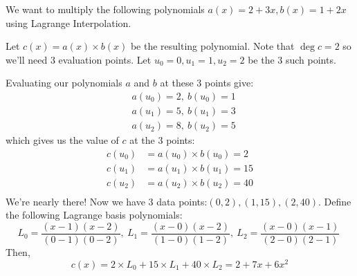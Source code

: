 \begin{example}{}{}
    We want to multiply the following polynomials $a(x) = 2 + 3x, b(x) = 1 + 2x$ using Lagrange Interpolation.

    Let $c(x) = a(x) \times b(x)$ be the resulting polynomial.
    Note that $\deg c = 2$ so we'll need 3 evaluation points.
    Let $u_0 = 0, u_1 = 1, u_2 = 2$ be the 3 such points. 

    Evaluating our polynomials $a$ and $b$ at these 3 points give:
    \begin{align*}
        &a(u_0) = 2, \ b(u_0) = 1 \\
        &a(u_1) = 5, \ b(u_1) = 3 \\
        &a(u_2) = 8, \ b(u_2) = 5 
    \end{align*}
    which gives us the value of $c$ at the 3 points:
    \begin{align*}
        c(u_0) &= a(u_0) \times b(u_0) = 2 \\
        c(u_1) &= a(u_1) \times b(u_1) = 15 \\
        c(u_2) &= a(u_2) \times b(u_2) = 40 \\
    \end{align*}
    We're nearly there! 
    Now we have 3 data points:$(0, 2), (1, 15), (2, 40)$.
    Define the following Lagrange basis polynomials:
    \begin{equation*}
        L_0 =  \frac{(x-1)(x-2)}{(0-1)(0-2)}, \
        L_1 =  \frac{(x-0)(x-2)}{(1-0)(1-2)}, \
        L_2 =  \frac{(x-0)(x-1)}{(2-0)(2-1)} \
    \end{equation*}
    Then,
    \begin{equation*}
        c(x) = 2 \times L_0 + 15 \times L_1 + 40 \times L_2 = 2 + 7x + 6x^2
    \end{equation*}
\end{example}

